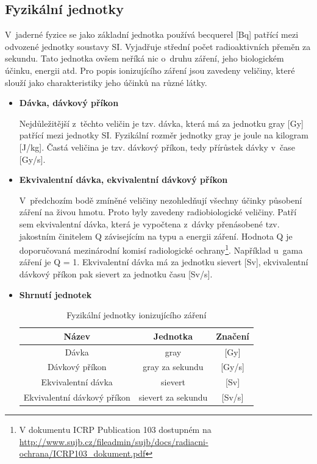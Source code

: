 \subsection{Fyzikální jednotky} V~jaderné fyzice se jako základní
jednotka používá becquerel [Bq] patřící mezi odvozené jednotky
soustavy SI. Vyjadřuje střední počet radioaktivních přeměn za
sekundu. Tato jednotka ovšem neříká nic o~druhu záření, jeho
biologickém účinku, energii atd. Pro popis ionizujícího záření jsou
zavedeny veličiny, které slouží jako charakteristiky jeho účinků na
různé látky. \cite{atomInfo}

\begin{itemize}
	\item \textbf{Dávka, dávkový příkon}
	
		 Nejdůležitější z~těchto veličin je tzv. dávka, která
má za jednotku gray [Gy] patřící mezi jednotky SI. Fyzikální
rozměr jednotky gray je joule na kilogram [J/kg]. Častá veličina je
 tzv. dávkový příkon, tedy přírůstek dávky v~čase [Gy/s].
		
	\item \textbf{Ekvivalentní dávka, ekvivalentní dávkový příkon}

	 	V~předchozím bodě zmíněné veličiny nezohledňují
všechny účinky působení záření na živou hmotu. Proto byly zavedeny
radiobiologické veličiny. Patří sem ekvivalentní dávka, která je
vypočtena z~dávky přenásobené tzv. jakostním činitelem Q závisejícím
na typu a energii záření. Hodnota Q je doporučovaná mezinárodní komisí
radiologické ochrany\footnote{V dokumentu ICRP Publication 103
dostupném na
\url{http://www.sujb.cz/fileadmin/sujb/docs/radiacni-ochrana/ICRP103\_dokument.pdf}}. Například
u~gama záření je Q = 1. Ekvivalentní dávka má za jednotku sievert
[Sv], ekvivalentní dávkový příkon pak sievert za jednotku času [Sv/s].
	 	
	\item \textbf{Shrnutí jednotek}
	
		\begin{table}[h!]  \centering
			\caption{Fyzikální jednotky ionizujícího
záření}
			\label{tab:tabulkaJednotek}
			\begin{tabular}{|c|c|c|} \hline \textbf{Název}
& \textbf{Jednotka} & \textbf{Značení} \\ \hline Dávka & gray &
{[}Gy{]} \\ \hline Dávkový příkon & gray za sekundu & {[}Gy/s{]} \\
\hline Ekvivalentní dávka & sievert & {[}Sv{]} \\ \hline Ekvivalentní
dávkový příkon & sievert za sekundu & {[}Sv/s{]} \\ \hline
			\end{tabular}
		\end{table}
\end{itemize}

